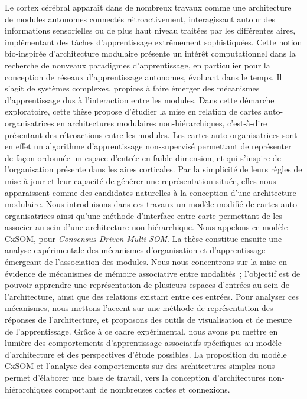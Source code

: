 \documentclass[11pt]{thesul-cs}
\begin{document}
\dominitoc

\begin{ThesisAbstract}
  \begin{FrenchAbstract}
  Le cortex cérébral apparaît dans de nombreux travaux comme une architecture de modules autonomes connectés rétroactivement, interagissant autour des informations sensorielles ou de plus haut niveau traitées par les différentes aires, implémentant des tâches d'apprentissage extrêmement sophistiquées. Cette notion bio-inspirée d'architecture modulaire présente un intérêt computationnel dans la recherche de nouveaux paradigmes d'apprentissage, en particulier pour la conception de réseaux d'apprentissage autonomes, évoluant dans le temps. Il s'agit de systèmes complexes, propices à faire émerger des mécanismes d'apprentissage dus à l'interaction entre les modules.
  Dans cette démarche exploratoire, cette thèse propose d'étudier la mise en relation de cartes auto-organisatrices en architectures modulaires non-hiérarchiques, c'est-à-dire présentant des rétroactions entre les modules.
  Les cartes auto-organisatrices sont en effet un algorithme d'apprentissage non-supervisé permettant de représenter de façon ordonnée un espace d'entrée en faible dimension, et qui s'inspire de l'organisation présente dans les aires corticales. Par la simplicité de leurs règles de mise à jour et leur capacité de générer une représentation située, elles nous apparaissent comme des candidates naturelles à la conception d'une architecture modulaire.
  Nous introduisons dans ces travaux un modèle modifié de cartes auto-organisatrices ainsi qu'une méthode d'interface entre carte permettant de les associer au sein d'une architecture non-hiérarchique. Nous appelons ce modèle CxSOM, pour \emph{Consensus Driven Multi-SOM}.
  La thèse constitue ensuite une analyse expérimentale des mécanismes d'organisation et d'apprentissage émergeant de l'association des modules. Nous nous concentrons sur la mise en évidence de mécanismes de mémoire associative entre modalités~; l'objectif est de pouvoir apprendre une représentation de plusieurs espaces d'entrées au sein de l'architecture, ainsi que des relations existant entre ces entrées.
  Pour analyser ces mécanismes, nous mettons l'accent sur une méthode de représentation des réponses de l'architecture, et proposons des outils de visualisation et de mesure de l'apprentissage. Grâce à ce cadre expérimental, nous avons pu mettre en lumière des comportements d'apprentissage associatifs spécifiques au modèle d'architecture et des perspectives d'étude possibles.
  La proposition du modèle CxSOM et l'analyse des comportements sur des architectures simples nous permet d'élaborer une base de travail, vers la conception d'architectures non-hiérarchiques comportant de nombreuses cartes et connexions.


\end{FrenchAbstract}
\end{ThesisAbstract}
\end{document}
